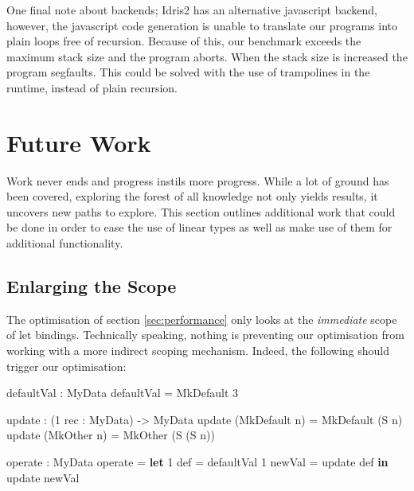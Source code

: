 \documentclass[
]{article}
\newenvironment{Shaded}{}{}
\newcommand{\DataTypeTok}[1]{\textcolor[rgb]{0.56,0.13,0.00}{#1}}
\newcommand{\DecValTok}[1]{\textcolor[rgb]{0.25,0.63,0.44}{#1}}
\newcommand{\KeywordTok}[1]{\textcolor[rgb]{0.00,0.44,0.13}{\textbf{#1}}}
\newcommand{\NormalTok}[1]{#1}
\newcommand{\OperatorTok}[1]{\textcolor[rgb]{0.40,0.40,0.40}{#1}}
\newcommand{\OtherTok}[1]{\textcolor[rgb]{0.00,0.44,0.13}{#1}}
\begin{document}
One final note about backends; Idris2 has an alternative javascript
backend, however, the javascript code generation is unable to translate
our programs into plain loops free of recursion. Because of this, our
benchmark exceeds the maximum stack size and the program aborts. When
the stack size is increased the program segfaults. This could be solved
with the use of trampolines in the runtime, instead of plain recursion.

\newpage

\hypertarget{future-work}{%
\section{Future Work}\label{future-work}}

\label{sec:future-work}

Work never ends and progress instils more progress. While a lot of
ground has been covered, exploring the forest of all knowledge not only
yields results, it uncovers new paths to explore. This section outlines
additional work that could be done in order to ease the use of linear
types as well as make use of them for additional functionality.

\hypertarget{enlarging-the-scope}{%
\subsection{Enlarging the Scope}\label{enlarging-the-scope}}

The optimisation of section \ref{sec:performance} only looks at the
\emph{immediate} scope of let bindings. Technically speaking, nothing is
preventing our optimisation from working with a more indirect scoping
mechanism. Indeed, the following should trigger our optimisation:

\begin{Shaded}
\begin{Highlighting}[]
\NormalTok{defaultVal }\OperatorTok{:} \DataTypeTok{MyData}
\NormalTok{defaultVal }\OtherTok{=} \DataTypeTok{MkDefault} \DecValTok{3}

\NormalTok{update }\OperatorTok{:}\NormalTok{ (}\DecValTok{1}\NormalTok{ rec }\OperatorTok{:} \DataTypeTok{MyData}\NormalTok{) }\OtherTok{{-}\textgreater{}} \DataTypeTok{MyData}
\NormalTok{update (}\DataTypeTok{MkDefault}\NormalTok{ n) }\OtherTok{=} \DataTypeTok{MkDefault}\NormalTok{ (}\DataTypeTok{S}\NormalTok{ n)}
\NormalTok{update (}\DataTypeTok{MkOther}\NormalTok{ n) }\OtherTok{=} \DataTypeTok{MkOther}\NormalTok{ (}\DataTypeTok{S}\NormalTok{ (}\DataTypeTok{S}\NormalTok{ n))}

\NormalTok{operate }\OperatorTok{:} \DataTypeTok{MyData}
\NormalTok{operate }\OtherTok{=} \KeywordTok{let} \DecValTok{1}\NormalTok{ def }\OtherTok{=}\NormalTok{ defaultVal}
              \DecValTok{1}\NormalTok{ newVal }\OtherTok{=}\NormalTok{ update def }\KeywordTok{in}
\NormalTok{              update newVal}
\end{Highlighting}
\end{Shaded}
\end{document}
